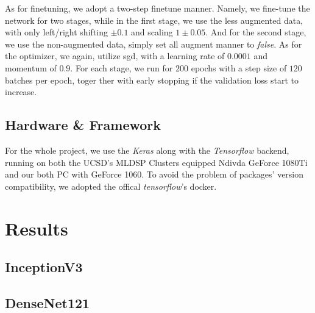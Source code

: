 \documentclass{article}
\begin{document}
As for finetuning, we adopt a two-step finetune manner. 
Namely, we fine-tune the network for two stages, while in the first stage, we use the less augmented data, with only left/right shifting $\pm 0.1$ and scaling $1\pm0.05$. 
And for the second stage, we use the non-augmented data, simply set all augment manner to \emph{false}. 
As for the optimizer, we again, utilize sgd, with a learning rate of $0.0001$ and momentum of $0.9$. 
For each stage, we run for $200$ epochs with a step size of $120$ batches per epoch, toger ther with early stopping if the validation loss start to increase. 

\subsection{Hardware \& Framework}
For the whole project, we use the \emph{Keras} along with the \emph{Tensorflow} backend, running on both the UCSD's MLDSP Clusters equipped Ndivda GeForce 1080Ti and our both PC with GeForce 1060. 
To avoid the problem of packages' version compatibility, we adopted the offical \emph{tensorflow}'s docker. 

\newpage
\section{Results}

\subsection{InceptionV3}
\subsection{DenseNet121}
\end{document}
